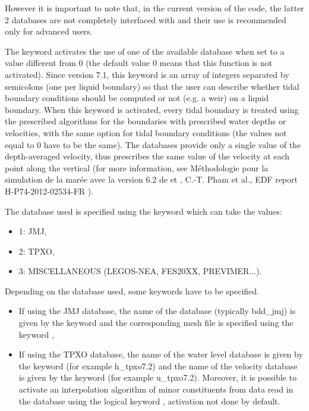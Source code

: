 However it is important to note that, in the current version of the code, the
latter 2 databases are not completely interfaced with  and their use
is recommended only for advanced users.

The keyword  activates the use of
one of the available database when set to a value different from 0
(the default value 0 means that this function is not activated). 
Since version 7.1, this keyword is an array of integers separated by semicolons
(one per liquid boundary) so that the user can describe whether tidal boundary
conditions should be computed or not (e.g. a weir) on a liquid boundary. 
When this keyword is activated, every tidal
boundary is treated using the prescribed algorithms for the boundaries with
prescribed water depths or velocities, with the same option for tidal boundary
conditions (the values not equal to 0 have to be the same).
The databases provide only a single value of the
depth-averaged velocity, thus  prescribes the same value of the
velocity at each point along the vertical (for more information, see
Méthodologie pour la simulation de la marée avec la version 6.2 de 
et , C.-T. Pham et al., EDF report H-P74-2012-02534-FR
\cite{Pham2012}).

The database used is specified using the keyword  which
can take the values:

\begin{itemize}
\item 1: JMJ,

\item 2: TPXO,

\item 3: MISCELLANEOUS (LEGOS-NEA, FES20XX, PREVIMER...).
\end{itemize}

Depending on the database used, some keywords have to be specified.

\begin{itemize}
\item If using the JMJ database, the name of the database (typically bdd\_jmj)
is given by the keyword  and the corresponding
mesh file is specified using the keyword ,

\item If using the TPXO database, the name of the water level database is given
by the keyword  (for example h\_tpxo7.2) and
the name of the velocity database is given by the keyword  (for example u\_tpxo7.2). Moreover, it is possible to
activate an interpolation algorithm of minor constituents from data read in the
database using the logical keyword ,
activation not done by default.
\end{itemize}

